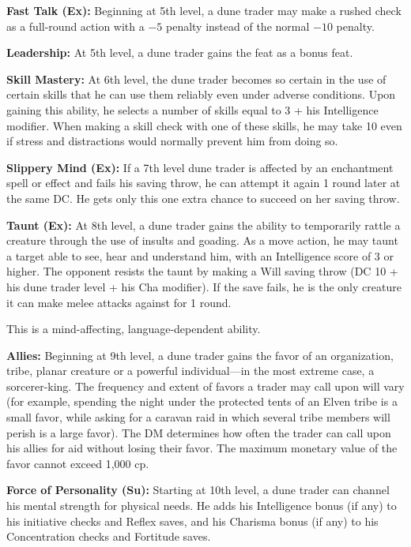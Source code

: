 {\textbf{Fast Talk (Ex):} Beginning at 5th level, a dune trader may make a rushed  check as a full-round action with a $-5$ penalty instead of the normal $-10$ penalty.

\textbf{Leadership:} At 5th level, a dune trader gains the  feat as a bonus feat.

\textbf{Skill Mastery:} At 6th level, the dune trader becomes so certain in the use of certain skills that he can use them reliably even under adverse conditions. Upon gaining this ability, he selects a number of skills equal to 3 + his Intelligence modifier. When making a skill check with one of these skills, he may take 10 even if stress and distractions would normally prevent him from doing so.

\textbf{Slippery Mind (Ex):} If a 7th level dune trader is affected by an enchantment spell or effect and fails his saving throw, he can attempt it again 1 round later at the same DC. He gets only this one extra chance to succeed on her saving throw.

\textbf{Taunt (Ex):} At 8th level, a dune trader gains the ability to temporarily rattle a creature through the use of insults and goading. As a move action, he may taunt a target able to see, hear and understand him, with an Intelligence score of 3 or higher. The opponent resists the taunt by making a Will saving throw (DC 10 + his dune trader level + his Cha modifier). If the save fails, he is the only creature it can make melee attacks against for 1 round.

This is a mind-affecting, language-dependent ability.

\textbf{Allies:} Beginning at 9th level, a dune trader gains the favor of an organization, tribe, planar creature or a powerful individual---in the most extreme case, a sorcerer-king. The frequency and extent of favors a trader may call upon will vary (for example, spending the night under the protected tents of an Elven tribe is a small favor, while asking for a caravan raid in which several tribe members will perish is a large favor). The DM determines how often the trader can call upon his allies for aid without losing their favor. The maximum monetary value of the favor cannot exceed 1,000 cp.

\textbf{Force of Personality (Su):} Starting at 10th level, a dune trader can channel his mental strength for physical needs. He adds his Intelligence bonus (if any) to his initiative checks and Reflex saves, and his Charisma bonus (if any) to his Concentration checks and Fortitude saves.
}
